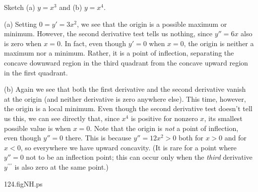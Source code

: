 \begin{example}

Sketch (a) $y=x^3$ and (b) $y=x^4$.

\smallskip


(a) Setting $0=y'=3x^2$, we see that the origin is a possible maximum or
minimum.  However, the second derivative test tells us nothing, since
$y''=6x$ also is zero when $x=0$.  In fact, even though $y'=0$ when $x=0$,
the origin is neither a maximum nor a minimum.  Rather, it is a point of
inflection, separating the concave downward region in the third quadrant
from the concave upward region in the first quadrant.

\smallskip


(b) Again we see that both the first derivative and the second derivative
vanish at the origin (and neither derivative is zero anywhere else).  This
time, however, the origin is a local minimum.  Even though the second derivative
test doesn't tell us this, we can see directly that, since $x^4$ is
positive for nonzero $x$, its smallest possible value is when $x=0$.  Note
that the origin is {\it not} a point of inflection, even though $y''=0$
there.  This is because $y''=12x^2>0$ both for $x>0$ and for $x<0$, so
everywhere we have upward concavity.  (It is rare for a point where $y''=0$
not to be an inflection point; this can occur only when the {\it third}
derivative $y^{\prime\prime\prime}$ is also zero at the same point.)

\begin{centering}
\begin{psfigure}{4.5in}{1.5in}{124.figNH.ps}
\end{psfigure}\\
\end{centering}

\end{example}


